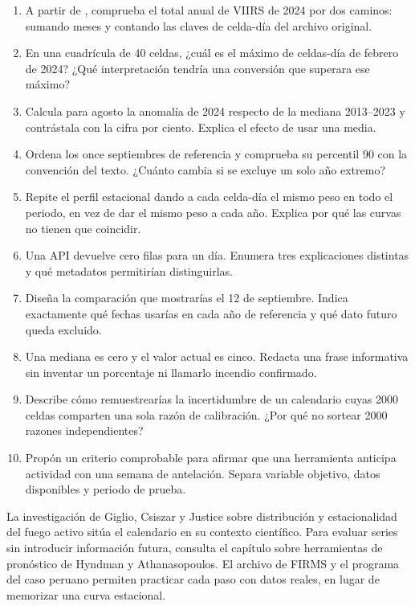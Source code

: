 \ejercicios
\begin{enumerate}
\item A partir de , comprueba el total anual de VIIRS de 2024 por
dos caminos: sumando meses y contando las claves de celda-día del archivo original.
\item En una cuadrícula de 40 celdas, ¿cuál es el máximo de celdas-día de febrero de 2024?
¿Qué interpretación tendría una conversión que superara ese máximo?
\item Calcula para agosto la anomalía de 2024 respecto de la mediana 2013--2023 y contrástala
con la cifra \PeruAgostoAnomalia{} por ciento. Explica el efecto de usar una media.
\item Ordena los once septiembres de referencia y comprueba su percentil 90 con la convención
del texto. ¿Cuánto cambia si se excluye un solo año extremo?
\item Repite el perfil estacional dando a cada celda-día el mismo peso en todo el periodo,
en vez de dar el mismo peso a cada año. Explica por qué las curvas no tienen que coincidir.
\item Una API devuelve cero filas para un día. Enumera tres explicaciones distintas y qué
metadatos permitirían distinguirlas.
\item Diseña la comparación que mostrarías el 12 de septiembre. Indica exactamente qué
fechas usarías en cada año de referencia y qué dato futuro queda excluido.
\item Una mediana es cero y el valor actual es cinco. Redacta una frase informativa sin
inventar un porcentaje ni llamarlo incendio confirmado.
\item Describe cómo remuestrearías la incertidumbre de un calendario cuyas 2000 celdas
comparten una sola razón de calibración. ¿Por qué no sortear 2000 razones independientes?
\item Propón un criterio comprobable para afirmar que una herramienta anticipa actividad
con una semana de antelación. Separa variable objetivo, datos disponibles y periodo de prueba.
\end{enumerate}

\lecturas
La investigación de Giglio, Csiszar y Justice sobre distribución y estacionalidad del fuego
activo sitúa el calendario en su contexto científico. Para evaluar
series sin introducir información futura, consulta el capítulo sobre herramientas de
pronóstico de Hyndman y Athanasopoulos. El archivo de FIRMS y el programa
del caso peruano permiten practicar cada paso con datos reales, en lugar de memorizar
una curva estacional.

